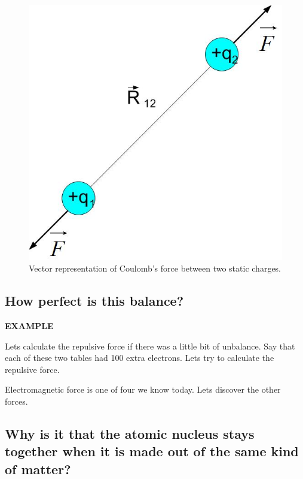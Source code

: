 \documentclass{ximera}
\begin{document}
\begin{figure}[htbp]
\begin{center}
\includegraphics[scale=0.5]{../jpg/Two_Static_Charges.jpg}
\end{center}
\caption{Vector representation of Coulomb's force between two static charges.}
\label{twostaticch}
\end{figure}


\subsection{How perfect is this balance?}

{\bf EXAMPLE} 


Lets calculate the repulsive force if there was a little bit of unbalance. Say that each of these two tables had 100 extra electrons. Lets try to calculate the repulsive force. 


Electromagnetic force is one of four we know today. Lets discover the other forces.


\subsection{Why is it that the atomic nucleus stays together when it is made out of the same kind of matter?}
\end{document}

